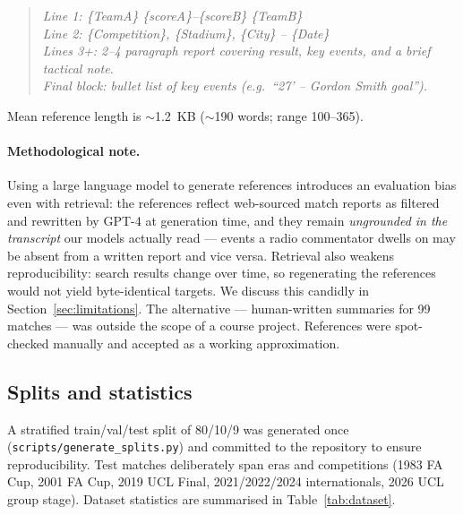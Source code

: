 \documentclass[10pt,a4paper]{article}
\begin{document}
\begin{quote}
\small\itshape
Line 1: \{TeamA\} \{scoreA\}--\{scoreB\} \{TeamB\}\\
Line 2: \{Competition\}, \{Stadium\}, \{City\} -- \{Date\}\\
Lines 3+: 2--4 paragraph report covering result, key events, and a brief tactical note.\\
Final block: bullet list of key events (e.g.\ ``27' -- Gordon Smith goal'').
\end{quote}

Mean reference length is $\sim$1.2~KB ($\sim$190 words; range 100--365).

\paragraph{Methodological note.}
Using a large language model to generate references introduces an evaluation bias even with retrieval: the references reflect web-sourced match reports as filtered and rewritten by GPT-4 at generation time, and they remain \emph{ungrounded in the transcript} our models actually read --- events a radio commentator dwells on may be absent from a written report and vice versa. Retrieval also weakens reproducibility: search results change over time, so regenerating the references would not yield byte-identical targets. We discuss this candidly in Section~\ref{sec:limitations}. The alternative --- human-written summaries for 99 matches --- was outside the scope of a course project. References were spot-checked manually and accepted as a working approximation.

\subsection{Splits and statistics}
A stratified train/val/test split of 80/10/9 was generated once (\texttt{scripts/generate\_splits.py}) and committed to the repository to ensure reproducibility. Test matches deliberately span eras and competitions (1983 FA Cup, 2001 FA Cup, 2019 UCL Final, 2021/2022/2024 internationals, 2026 UCL group stage). Dataset statistics are summarised in Table~\ref{tab:dataset}.
\end{document}
